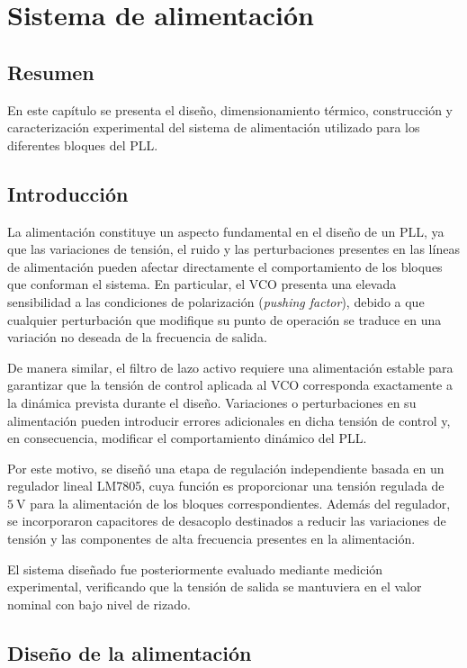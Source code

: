 \chapter{Sistema de alimentación}

\section*{Resumen}

En este capítulo se presenta el diseño, dimensionamiento térmico, construcción y caracterización experimental del sistema de alimentación utilizado para los diferentes bloques del PLL.

\section{Introducción}

La alimentación constituye un aspecto fundamental en el diseño de un PLL, ya que las variaciones de tensión, el ruido y las perturbaciones presentes en las líneas de alimentación pueden afectar directamente el comportamiento de los bloques que conforman el sistema. En particular, el VCO presenta una elevada sensibilidad a las condiciones de polarización (\textit{pushing factor}), debido a que cualquier perturbación que modifique su punto de operación se traduce en una variación no deseada de la frecuencia de salida.

De manera similar, el filtro de lazo activo requiere una alimentación estable para garantizar que la tensión de control aplicada al VCO corresponda exactamente a la dinámica prevista durante el diseño. Variaciones o perturbaciones en su alimentación pueden introducir errores adicionales en dicha tensión de control y, en consecuencia, modificar el comportamiento dinámico del PLL.

Por este motivo, se diseñó una etapa de regulación independiente basada en un regulador lineal LM7805, cuya función es proporcionar una tensión regulada de $5~\mathrm{V}$ para la alimentación de los bloques correspondientes. Además del regulador, se incorporaron capacitores de desacoplo destinados a reducir las variaciones de tensión y las componentes de alta frecuencia presentes en la alimentación.

El sistema diseñado fue posteriormente evaluado mediante medición experimental, verificando que la tensión de salida se mantuviera en el valor nominal con bajo nivel de rizado.

\section{Diseño de la alimentación}

